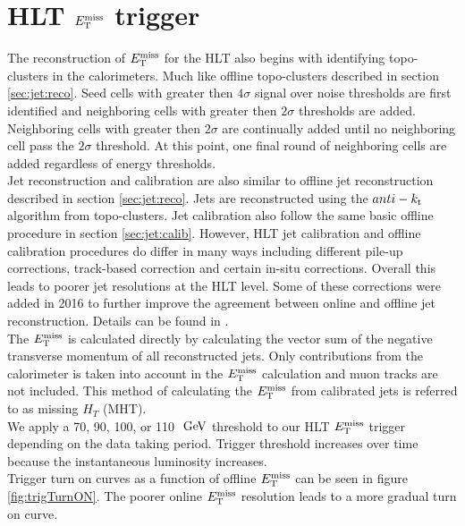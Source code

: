 \section{HLT $E_{\mathrm{T}}^{\mathrm{miss}}$ trigger}
\label{sec:trig:HLT_MET}

\indent The reconstruction of $E_{\mathrm{T}}^{\mathrm{miss}}$ for the HLT also begins with identifying topo-clusters in the calorimeters.  Much like offline topo-clusters described in section \ref{sec:jet:reco}.  Seed cells with greater then $4\sigma$ signal over noise thresholds are first identified and neighboring cells with greater then $2\sigma$ thresholds are added.  Neighboring cells with greater then $2\sigma$ are continually added until no neighboring cell pass the $2\sigma$ threshold.  At this point, one final round of neighboring cells are added regardless of energy thresholds. \\

\indent Jet reconstruction and calibration are also similar to offline jet reconstruction described in section \ref{sec:jet:reco}.  Jets are reconstructed using the $anti-k_{\rm{t}}$ algorithm from topo-clusters.  Jet calibration also follow the same basic offline procedure in section \ref{sec:jet:calib}. However, HLT jet calibration and offline calibration procedures do differ in many ways including different pile-up corrections, track-based correction and certain in-situ corrections.  Overall this leads to poorer jet resolutions at the HLT level.  Some of these corrections were added in 2016 to further improve the agreement between online and offline jet reconstruction.  Details can be found in \cite{Trigger2016}. \\

\indent The $E_{\mathrm{T}}^{\mathrm{miss}}$ is calculated directly by calculating the vector sum of the negative transverse momentum of all reconstructed jets.  Only contributions from the calorimeter is taken into account in the $E_{\mathrm{T}}^{\mathrm{miss}}$ calculation and muon tracks are not included.  This method of calculating the $E_{\mathrm{T}}^{\mathrm{miss}}$ from calibrated jets is referred to as missing $H_T$ (MHT).  \\

\indent We apply a 70, 90, 100, or 110 $\gev$ threshold to our HLT $E_{\mathrm{T}}^{\mathrm{miss}}$ trigger depending on the data taking period.  Trigger threshold increases over time because the instantaneous luminosity increases. \\

\indent Trigger turn on curves as a function of offline $E_{\mathrm{T}}^{\mathrm{miss}}$ can be seen in figure \ref{fig:trigTurnON}.  The poorer online $E_{\mathrm{T}}^{\mathrm{miss}}$ resolution leads to a more gradual turn on curve. \\

